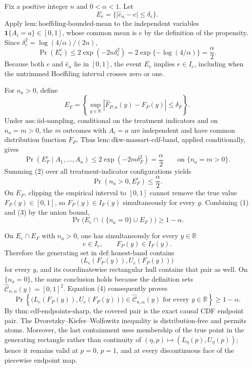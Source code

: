 Fix a positive integer \(n\) and \(0<\alpha<1\).  Let
\[
 E_e=\{|\widehat e_n-e|\le\delta_e\}.
\]
Apply \(\mathrm{lem:hoeffding\text{-}bounded\text{-}mean}\) to the independent variables \(\mathbf 1\{A_i=a\}\in[0,1]\), whose common mean is \(e\) by the definition of the propensity.  Since \(\delta_e^2=\log(4/\alpha)/(2n)\),
\[
 \Pr(E_e^c)
 \le 2\exp(-2n\delta_e^2)
 =2\exp\{-\log(4/\alpha)\}
 =\frac{\alpha}{2}. \tag{1}
\]
Because both \(e\) and \(\widehat e_n\) lie in \([0,1]\), the event \(E_e\) implies \(e\in I_e\), including when the untrimmed Hoeffding interval crosses zero or one.

For \(n_a>0\), define
\[
 E_F=\left\{\sup_{y\in\mathbb R}|\widehat F_{P,n}(y)-F_P(y)|\le\delta_F\right\}.
\]
Under \(\mathrm{ass:iid\text{-}sampling}\), conditional on the treatment indicators and on \(n_a=m>0\), the \(m\) outcomes with \(A_i=a\) are independent and have common distribution function \(F_P\).  Thus \(\mathrm{lem:dkw\text{-}massart\text{-}cdf\text{-}band}\), applied conditionally, gives
\[
 \Pr(E_F^c\mid A_1,\ldots,A_n)
 \le 2\exp(-2m\delta_F^2)
 =\frac{\alpha}{2}
 \qquad\text{on }\{n_a=m>0\}. \tag{2}
\]
Summing (2) over all treatment-indicator configurations yields
\[
 \Pr(n_a>0,E_F^c)\le\frac{\alpha}{2}. \tag{3}
\]
On \(E_F\), clipping the empirical interval to \([0,1]\) cannot remove the true value \(F_P(y)\in[0,1]\), so \(F_P(y)\in I_F(y)\) simultaneously for every \(y\).
Combining (1) and (3) by the union bound,
\[
 \Pr\bigl(E_e\cap(\{n_a=0\}\cup E_F)\bigr)\ge1-\alpha. \tag{4}
\]

On \(E_e\cap E_F\) with \(n_a>0\), one has simultaneously for every \(y\in\mathbb R\)
\[
 e\in I_e,
 \qquad
 F_P(y)\in I_F(y).
\]
Therefore the generating set in \(\mathrm{def:honest\text{-}band}\) contains
\[
 \bigl(L_e(F_P(y)),U_e(F_P(y))\bigr)
\]
for every \(y\), and its coordinatewise rectangular hull contains that pair as well.  On \(\{n_a=0\}\), the same conclusion holds because the definition sets \(\widehat{\mathcal C}_{n,\alpha}(y)=[0,1]^2\).  Equation (4) consequently proves
\[
 \Pr\left\{
 \bigl(L_e(F_P(y)),U_e(F_P(y))\bigr)
 \in\widehat{\mathcal C}_{n,\alpha}(y)
 \text{ for every }y\in\mathbb R
 \right\}\ge1-\alpha.
\]
By \(\mathrm{thm:cdf\text{-}endpoints\text{-}sharp}\), the covered pair is the exact causal CDF endpoint pair.  The Dvoretzky--Kiefer--Wolfowitz inequality is distribution-free and permits atoms.  Moreover, the last containment uses membership of the true point in the generating rectangle rather than continuity of \((\eta,p)\mapsto(L_\eta(p),U_\eta(p))\); hence it remains valid at \(p=0\), \(p=1\), and at every discontinuous face of the piecewise endpoint map.